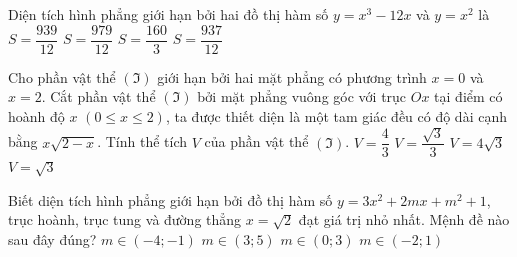 \begin{ex}%
	Diện tích hình phẳng giới hạn bởi hai đồ thị hàm số $ y = x^3 - 12x $ và $ y = x^2 $ là
	\choice
	{$ S = \dfrac{939}{12} $}
	{$ S = \dfrac{979}{12} $}
	{$ S = \dfrac{160}{3} $}
	{\True $ S = \dfrac{937}{12} $}
\end{ex}
\begin{ex}%
	Cho phần vật thể $\left( \Im  \right)$ giới hạn bởi hai mặt phẳng có phương trình $x = 0$ và $x = 2$. Cắt phần vật thể $\left(\Im\right)$ bởi mặt phẳng vuông góc với trục $Ox$ tại điểm có hoành độ $x$ $\left({0 \leq x \leq 2} \right)$, ta được thiết diện là một tam giác đều có độ dài cạnh bằng $x\sqrt{2 - x} $. Tính thể tích $V$ của phần vật thể $\left( \Im  \right)$.
	\choice
	{$V = \dfrac{4}{3}$}
	{\True $V = \dfrac{\sqrt 3 }{3}$}
	{$V = 4\sqrt 3$}
	{$V = \sqrt 3$}
\end{ex}
\begin{ex}%
	Biết diện tích hình phẳng giới hạn bởi đồ thị hàm số $y=3x^2+2mx+m^2+1$, trục hoành, trục tung và đường thẳng $x=\sqrt{2}$ đạt giá trị nhỏ nhất. Mệnh đề nào sau đây đúng?
	\choice
	{$m\in(-4;-1)$}
	{$m\in(3;5)$}
	{$m\in(0;3)$}
	{\True $m\in(-2;1)$}
\end{ex}
